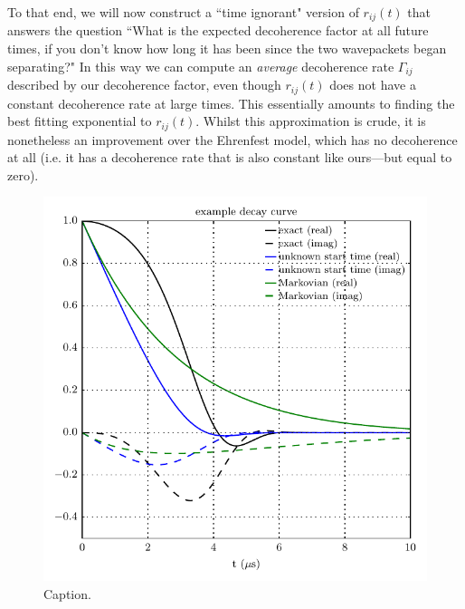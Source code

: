 To that end, we will now construct a ``time ignorant" version of $r_{ij}(t)$ that answers the question ``What is the expected decoherence factor at all future times, if you don't know how long it has been since the two wavepackets began separating?" In this way we can compute an \emph{average} decoherence rate $\Gamma_{ij}$ described by our decoherence factor, even though $r_{ij}(t)$ does not have a constant decoherence rate at large times. This essentially amounts to finding the best fitting exponential to $r_{ij}(t)$. Whilst this approximation is crude, it is nonetheless an improvement over the Ehrenfest model, which has no decoherence at all (i.e. it has a decoherence rate that is also constant like ours---but equal to zero).

\begin{figure}[t]
    \centerfloat
    \includegraphics{figures/hidden_variables/decoherence_factor_example.pdf}
    \caption{Caption.}
    \label{fig:decoherence_factor_example}
\end{figure}

